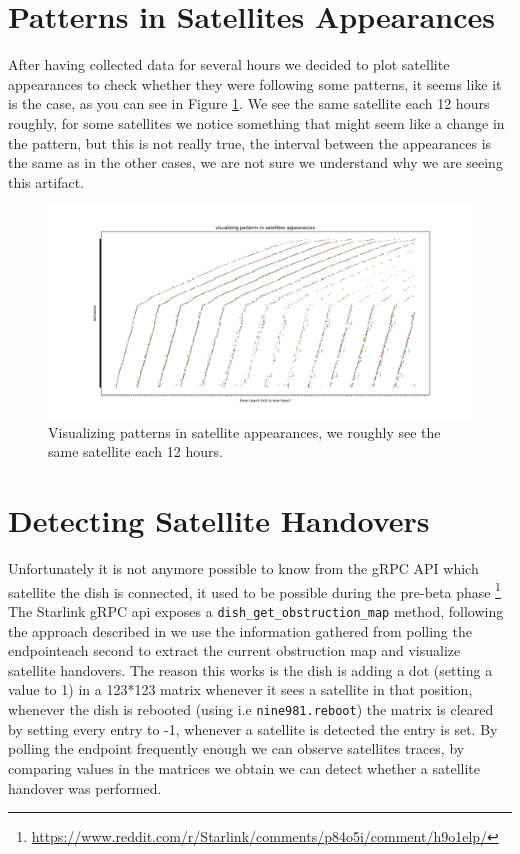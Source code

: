 \documentclass[IN,11pt,twoside,openright,bachelor,english]{tumthesis}
\begin{document}
\section{Patterns in Satellites Appearances}
After having collected data for several hours we decided to plot satellite appearances to check whether they were following some patterns, it seems like it is the case, as you can see in Figure \ref{fig:vis-sat-pat}. We see the same satellite each 12 hours roughly, for some satellites we notice something that might seem like a change in the pattern, but this is not really true, the interval between the appearances is the same as in the other cases, we are not sure we understand why we are seeing this artifact.

\begin{figure}
	\label{fig:vis-sat-pat}
	\centering
	\includegraphics[width=1.2\columnwidth]{img/visualizing-how-long-satellites-are-visible-for.png}
	\caption{Visualizing patterns in satellite appearances, we roughly see the same satellite each 12 hours.}
\end{figure}

\section{Detecting Satellite Handovers}

Unfortunately it is not anymore possible to know from the gRPC API which satellite the dish is connected, it used to be possible during the pre-beta phase \footnote{\url{https://www.reddit.com/r/Starlink/comments/p84o5i/comment/h9o1elp/}}
The Starlink gRPC api exposes a \texttt{dish\_get\_obstruction\_map} method, following the approach described in \cite{izhikevich2023democratizing} we use the information gathered from polling the endpointeach second to extract the current obstruction map and visualize satellite handovers. The reason this works is the dish is adding a dot (setting a value to 1) in a 123*123 matrix whenever it sees a satellite in that position, whenever the dish is rebooted (using i.e \texttt{nine981.reboot}) the matrix is cleared by setting every entry to -1, whenever a satellite is detected the entry is set. By polling the endpoint frequently enough we can observe satellites traces, by comparing values in the matrices we obtain we can detect whether a satellite handover was performed.
\end{document}
